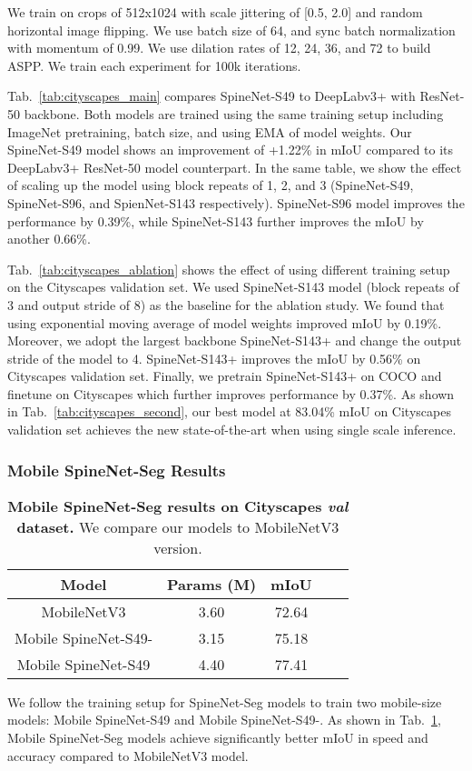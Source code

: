 \documentclass[10pt,twocolumn,letterpaper]{article}
\begin{document}
We train on crops of 512x1024 with scale jittering of [0.5, 2.0] and random horizontal image flipping. We use batch size of 64, and sync batch normalization with momentum of 0.99. We use dilation rates of 12, 24, 36, and 72 to build ASPP. We train each experiment for 100k iterations.


Tab.~\ref{tab:cityscapes_main} compares SpineNet-S49 to DeepLabv3+ with ResNet-50 backbone. Both models are trained using the same training setup including ImageNet pretraining, batch size, and using EMA of model weights. Our SpineNet-S49 model shows an improvement of +1.22\% in mIoU compared to its DeepLabv3+ ResNet-50 model counterpart. In the same table, we show the effect of scaling up the model using block repeats of 1, 2, and 3 (SpineNet-S49, SpineNet-S96, and SpienNet-S143 respectively). SpineNet-S96 model improves the performance by 0.39\%, while SpineNet-S143 further improves the mIoU by another 0.66\%.

Tab.~\ref{tab:cityscapes_ablation} shows the effect of using different training setup on the Cityscapes validation set. We used SpineNet-S143 model (block repeats of 3 and output stride of 8) as the baseline for the ablation study. We found that using exponential moving average of model weights improved mIoU by 0.19\%. Moreover, we adopt the largest backbone SpineNet-S143+ and change the output stride of the model to 4. SpineNet-S143+ improves the mIoU by 0.56\% on Cityscapes validation set. Finally, we pretrain SpineNet-S143+ on COCO and finetune on Cityscapes which further improves performance by 0.37\%. As shown in Tab.~\ref{tab:cityscapes_second}, our best model at 83.04\% mIoU on Cityscapes validation set achieves the new state-of-the-art when using single scale inference.

\subsubsection{Mobile SpineNet-Seg Results}
\setlength{\tabcolsep}{4pt}
\begin{table}[h!]
\centering
\begin{tabular}{c| c | c  c | c}
  \toprule
  Model & Params (M) & mIoU  \\
  \midrule
  MobileNetV3 \cite{mobilenetv3} & 3.60 & 72.64\\
  \midrule
  Mobile SpineNet-S49- & 3.15 & 75.18 \\
  Mobile SpineNet-S49 & 4.40 & 77.41 \\
  \bottomrule
\end{tabular}
\caption{\textbf{Mobile SpineNet-Seg results on Cityscapes \textit{val} dataset.} We compare our models to MobileNetV3 version.}
\label{tab:cityscapes_mobilenet} 
\end{table}
We follow the training setup for SpineNet-Seg models to train two mobile-size models: Mobile SpineNet-S49 and Mobile SpineNet-S49-. As shown in Tab.~\ref{tab:cityscapes_mobilenet}, Mobile SpineNet-Seg models achieve significantly better mIoU in speed and accuracy compared to MobileNetV3 model.
\end{document}
